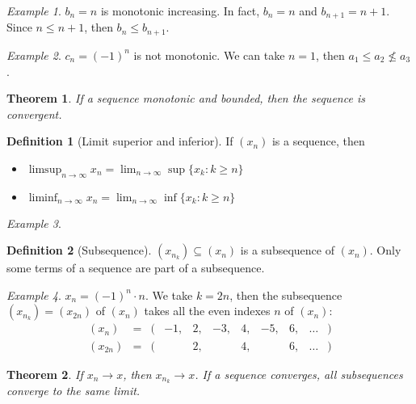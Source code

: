 \documentclass{article}
\newcommand{\limn}{\lim_{n \to \infty}}
\theoremstyle{definition}
\newtheorem{definition}{Definition}[section]
\theoremstyle{definition}
\theoremstyle{plain}
\newtheorem{theorem}{Theorem}[section]
\theoremstyle{plain}
\theoremstyle{plain}
\theoremstyle{plain}
\theoremstyle{definition}
\theoremstyle{remark}
\newtheorem{exampled}{Example}[definition]
\theoremstyle{remark}
\theoremstyle{remark}
\theoremstyle{remark}
\begin{document}
\begin{exampled}
  $b_n = n$ is monotonic increasing. In fact, $b_n = n$ and $b_{n+1} = n + 1$. Since $n \leq n + 1$, then $b_n \leq b_{n+1}$.
\end{exampled}

\begin{exampled}
  $c_n = (-1)^n$ is not monotonic. We can take $n = 1$, then $a_1 \leq a_2 \nleq a_3$.
\end{exampled}


\begin{theorem}
  If a sequence monotonic and bounded, then the sequence is convergent.
\end{theorem}



\begin{definition}[Limit superior and inferior]
  If $(x_n)$ is a sequence, then
  \begin{itemize}
    \item $\limsup_{n \to \infty} x_n = \limn \sup\{x_k : k \geq n\}$
    \item $\liminf_{n \to \infty} x_n = \limn \inf\{x_k : k \geq n\}$
  \end{itemize}
\end{definition}

\begin{exampled}

\end{exampled}


\begin{definition}[Subsequence]
  $(x_{n_k}) \subseteq (x_n)$ is a subsequence of $(x_n)$. Only some terms of a sequence are part of a subsequence.
\end{definition}

\begin{exampled}
  $x_n = (-1)^n \cdot n$. We take $k = 2n$, then the subsequence
  $(x_{n_k}) = (x_{2n})$ of $(x_n)$ takes all the even indexes $n$ of $(x_n)$:
  \[
    \begin{array}{lcrcccccccl}
      (x_n)    & = & ( & -1, & 2, & -3, & 4, & -5, & 6, & \hdots & )\\
      (x_{2n}) & = & ( &     & 2, &     & 4, &     & 6, & \hdots & )
    \end{array}
  \]
\end{exampled}


\begin{theorem}
  If $x_n \to x$, then $x_{n_k} \to x$. If a sequence converges, all subsequences converge to the same limit.
\end{theorem}
\end{document}
